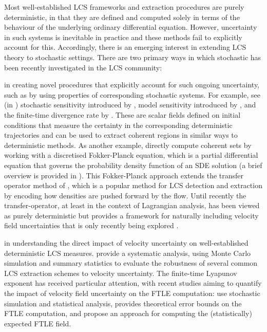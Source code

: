 Most well-established LCS frameworks and extraction procedures are purely deterministic, in that they are defined and computed solely in terms of the behaviour of the underlying ordinary differential equation.
However, uncertainty in such systems is inevitable in practice and these methods fail to explicitly account for this.
Accordingly, there is an emerging interest \citep{Balasuriya_2020_StochasticApproachesLagrangian} in extending LCS theory to stochastic settings.
There are two primary ways in which stochastic has been recently investigated in the LCS community:
\begin{romanate}
	\item in creating novel procedures that explicitly account for such ongoing uncertainty, such as by using properties of corresponding stochastic systems.
	For example, see (in ) stochastic sensitivity introduced by \citet{Balasuriya_2020_StochasticSensitivityComputable}, model sensitivity introduced by \citet{KaszasHaller_2020_UniversalUpperEstimate}, and the finite-time divergence rate by \citet{BranickiUda_2023_PathBasedDivergenceRates}.
	These are scalar fields defined on initial conditions that measure the certainty in the corresponding deterministic trajectories and can be used to extract coherent regions in similar ways to deterministic methods.
	As another example, \citet{DennerEtAl_2016_ComputingCoherentSets} directly compute coherent sets by working with a discretised Fokker-Planck equation, which is a partial differential equation that governs the probability density function of an SDE solution (a brief overview is provided in ).
	This Fokker-Planck approach extends the transfer operator method of \citet{Froyland_2013_AnalyticFrameworkIdentifying}, which is a popular method for LCS detection and extraction by encoding how densities are pushed forward by the flow.
	Until recently the transfer-operator, at least in the context of Lagrangian analysis, has been viewed as purely deterministic but provides a framework for naturally including velocity field uncertainties that is only recently being explored \citet{Balasuriya_2020_StochasticApproachesLagrangian}.

	\item in understanding the direct impact of velocity uncertainty on well-established deterministic LCS measures.
	\citet{BadzaEtAl_2023_HowSensitiveAre} provide a systematic analysis, using Monte Carlo simulation and summary statistics to evaluate the robustness of several common LCS extraction schemes to velocity uncertainty.
	The finite-time Lyapunov exponent has received particular attention, with recent studies aiming to quantify the impact of velocity field uncertainty on the FTLE computation: \citet{GuoEtAl_2016_FiniteTimeLyapunovExponents} use stochastic simulation and statistical analysis, \citet{Balasuriya_2020_UncertaintyFinitetimeLyapunov} provides theoretical error bounds on the FTLE computation, and \citet{YouLeung_2021_ComputingFiniteTime} propose an approach for computing the (statistically) expected FTLE field.

\end{romanate}
